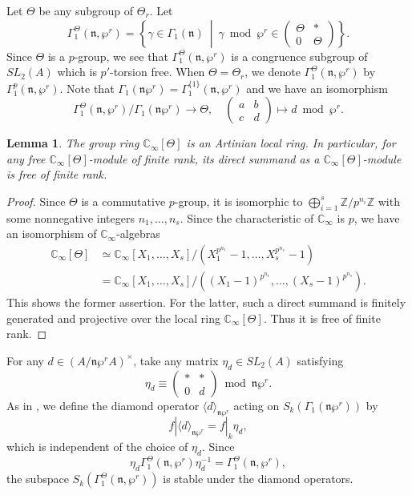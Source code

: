 \documentclass[11pt]{amsart}
\theoremstyle{plain}
\newtheorem{lem}[thm]{Lemma}
\theoremstyle{definition}
\newcommand{\bZ}{\mathbb{Z}}
\newcommand{\frn}{\mathfrak{n}}
\newcommand{\Cinf}{\mathbb{C}_{\infty}}
\begin{document}
Let $\Theta$ be any subgroup of $\Theta_r$. Let
\[
\Gamma_1^\Theta(\frn,\wp^r)=\left\{\gamma\in \Gamma_1(\frn)\ \middle|\ \gamma\bmod \wp^r\in \begin{pmatrix}
	\Theta & *\\0& \Theta
\end{pmatrix}\right\}.
\]
Since $\Theta$ is a $p$-group, we see that $\Gamma_1^\Theta(\frn,\wp^r)$ is a congruence subgroup of $\mathit{SL}_2(A)$ which is $p'$-torsion free.
When $\Theta=\Theta_r$, we denote $\Gamma_1^\Theta(\frn,
\wp^r)$ by $\Gamma_1^p(\frn,\wp^r)$. 
Note that $\Gamma_1(\frn\wp^r)=\Gamma_1^{\{1\}}(\frn,\wp^r)$ and we have an isomorphism
\begin{equation}\label{EqnIsomQuotTheta}
\Gamma_1^\Theta(\frn,\wp^r)/\Gamma_1(\frn\wp^r)\to \Theta,\quad \begin{pmatrix}
	a&b\\c&d
\end{pmatrix}\mapsto d\bmod \wp^r.
\end{equation}

\begin{lem}\label{LemGrpRingLocal}
	The group ring $\Cinf[\Theta]$ is an Artinian local ring. In particular, for any free $\Cinf[\Theta]$-module of finite rank, its direct summand
	as a $\Cinf[\Theta]$-module is free of finite rank.
\end{lem}
\begin{proof}
	Since $\Theta$ is a commutative $p$-group, it is isomorphic to $\bigoplus_{i=1}^s \bZ/p^{n_i} \bZ$
	with some nonnegative integers $n_1,\ldots, n_s$. 
	Since the characteristic of $\Cinf$ is $p$, we have an isomorphism of $\Cinf$-algebras
	\[
	\begin{aligned}
	\Cinf[\Theta]&\simeq \Cinf[X_1,\ldots, X_s]/(X_1^{p^{n_1}}-1,\ldots, X_s^{p^{n_s}}-1)\\
	&=\Cinf[X_1,\ldots, X_s]/((X_1-1)^{p^{n_1}},\ldots, (X_s-1)^{p^{n_s}}).
	\end{aligned}
	\]
	This shows the former assertion. For the latter, such a direct summand is finitely generated and projective over the local ring $\Cinf[\Theta]$.
	Thus it is free of finite rank.
\end{proof}

For any $d\in (A/\frn\wp^rA)^\times$, take any matrix $\eta_d\in\mathit{SL}_2(A)$ satisfying
\[
\eta_d\equiv \begin{pmatrix}
	* & *\\0& d
\end{pmatrix}\bmod \frn\wp^r.
\]
As in \cite[\S2.2]{Ha_DMO}, we define the diamond operator $\langle d\rangle_{\frn\wp^r}$ acting on $S_k(\Gamma_1(\frn\wp^r))$ by
\[
f|\langle d\rangle_{\frn\wp^r}=f|_k\eta_d,
\]
which is independent of the choice of $\eta_d$. Since 
\begin{equation*}%
	\eta_d \Gamma_1^\Theta(\frn,\wp^r)\eta_d^{-1}= \Gamma_1^\Theta(\frn,\wp^r), 
\end{equation*}
the subspace
$S_k(\Gamma_1^\Theta(\frn,\wp^r))$ is stable under the diamond operators. 
\end{document}
